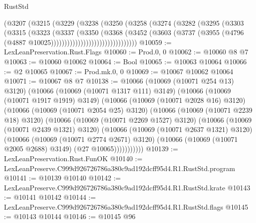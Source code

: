 \begin{lexlean}{RustStd}
\begin{coremodule}
                          (@3207
                            (@3215
                              (@3229
                                (@3238
                                  (@3250
                                    (@3258
                                      (@3274
                                        (@3282
                                          (@3295
                                            (@3303
                                              (@3315
                                                (@3323
                                                  (@3337
                                                    (@3350
                                                      (@3368
                                                        (@3452
                                                          (@3603
                                                            (@3737
                                                              (@3955
                                                                (@4796
                                                                  (@4887
                                                                    @10025))))))))))))))))))))))))))))))))
@10059 := LexLeanPreservation.Rust.Flags
@10060 := Prod.{0, 0}
@10062 := @10060 @8 @7
@10063 := @10060 @10062
@10064 := Bool
@10065 := @10063 @10064
@10066 := @2 @10065
@10067 := Prod.mk.{0, 0}
@10069 := @10067 @10062 @10064
@10071 := @10067 @8 @7
@10138 := @10066
    (@10069 (@10071 @254 @13) @3120)
    (@10066
      (@10069 (@10071 @1317 @111) @3149)
      (@10066
        (@10069 (@10071 @1917 @1919) @3149)
        (@10066
          (@10069 (@10071 @2028 @16) @3120)
          (@10066
            (@10069 (@10071 @2054 @25) @3120)
            (@10066
              (@10069 (@10071 @2239 @18) @3120)
              (@10066
                (@10069 (@10071 @2269 @1527) @3120)
                (@10066
                  (@10069 (@10071 @2439 @1321) @3120)
                  (@10066
                    (@10069 (@10071 @2637 @1321) @3120)
                    (@10066
                      (@10069 (@10071 @2774 @2671) @3120)
                      (@10066 (@10069 (@10071 @2005 @2688) @3149) (@27 @10065)))))))))))
@10139 := LexLeanPreservation.Rust.FunOK
@10140 := LexLeanPreserve.C999d926726786a380c9ad192dcff95d4.R1.RustStd.program
@10141 := @10139 @10140
@10142 := LexLeanPreserve.C999d926726786a380c9ad192dcff95d4.R1.RustStd.krate
@10143 := @10141 @10142
@10144 := LexLeanPreserve.C999d926726786a380c9ad192dcff95d4.R1.RustStd.flags
@10145 := @10143 @10144
@10146 := @10145 @96

\end{coremodule}
\end{lexlean}
